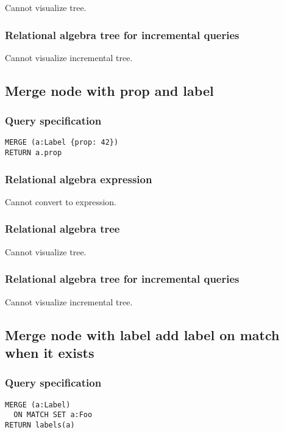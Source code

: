 Cannot visualize tree.

\subsubsection*{Relational algebra tree for incremental queries}

Cannot visualize incremental tree.

\subsection{Merge node with prop and label}

\subsubsection*{Query specification}

\begin{lstlisting}
MERGE (a:Label {prop: 42})
RETURN a.prop
\end{lstlisting}

\subsubsection*{Relational algebra expression}

Cannot convert to expression.

\subsubsection*{Relational algebra tree}

Cannot visualize tree.

\subsubsection*{Relational algebra tree for incremental queries}

Cannot visualize incremental tree.

\subsection{Merge node with label add label on match when it exists}

\subsubsection*{Query specification}

\begin{lstlisting}
MERGE (a:Label)
  ON MATCH SET a:Foo
RETURN labels(a)
\end{lstlisting}

